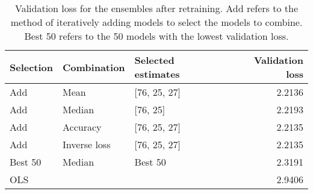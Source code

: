 \begin{table}
\centering
\caption{Validation loss for the ensembles after retraining. Add refers to the method of iteratively adding models to select the models to combine. Best 50 refers to the 50 models with the lowest validation loss.}
\label{tab:Results_combined_retrained}
\begin{tabular}{lllr}
\toprule
Selection &  Combination & Selected estimates &  Validation loss \\
\midrule
      Add &         Mean &       [76, 25, 27] &           2.2136 \\
      Add &       Median &           [76, 25] &           2.2193 \\
      Add &     Accuracy &       [76, 25, 27] &           2.2135 \\
      Add & Inverse loss &       [76, 25, 27] &           2.2135 \\
  Best 50 &       Median &            Best 50 &           2.3191 \\
      OLS &              &                    &           2.9406 \\
\bottomrule
\end{tabular}
\end{table}
